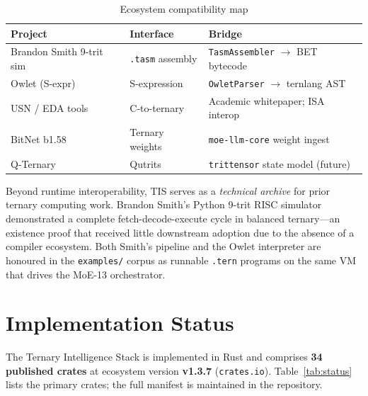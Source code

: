 \documentclass[journal,10pt,twocolumn]{IEEEtran}
\begin{document}
\begin{table}[h]
\centering
\small
\caption{Ecosystem compatibility map}
\label{tab:ecosystem}
\begin{tabular}{p{2.0cm}p{1.8cm}p{3.3cm}}
\toprule
Project & Interface & Bridge \\
\midrule
Brandon Smith 9-trit sim & \texttt{.tasm} assembly & \texttt{TasmAssembler} $\to$ BET bytecode \\
Owlet (S-expr) & S-expression & \texttt{OwletParser} $\to$ ternlang AST \\
USN / EDA tools & C-to-ternary & Academic whitepaper; ISA interop \\
BitNet b1.58 & Ternary weights & \texttt{moe-llm-core} weight ingest \\
Q-Ternary & Qutrits & \texttt{trittensor} state model (future) \\
\bottomrule
\end{tabular}
\end{table}

Beyond runtime interoperability, TIS serves as a \emph{technical archive}
for prior ternary computing work. Brandon Smith's Python 9-trit RISC
simulator demonstrated a complete fetch-decode-execute cycle in balanced
ternary---an existence proof that received little downstream adoption due to
the absence of a compiler ecosystem. Both Smith's pipeline and the Owlet
interpreter are honoured in the \texttt{examples/} corpus as runnable
\texttt{.tern} programs on the same VM that drives the MoE-13 orchestrator.

\section{Implementation Status}
\label{sec:status}

The Ternary Intelligence Stack is implemented in Rust and comprises
\textbf{34 published crates} at ecosystem version \textbf{v1.3.7}
(\texttt{crates.io}). Table~\ref{tab:status} lists the primary crates;
the full manifest is maintained in the repository.
\end{document}
